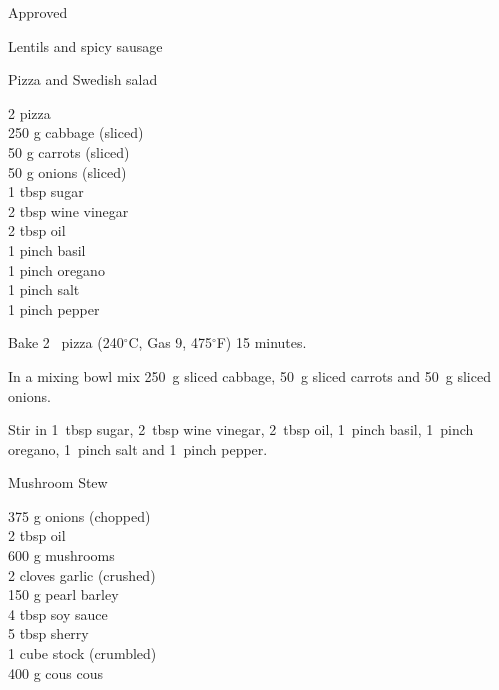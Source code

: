 \begin{menu}{Approved}
\begin{recipe}{2}{Lentils and spicy sausage}
\begin{instructions}
    \end{instructions}
    \end{recipe}%
  
    \begin{recipe}{1}{Pizza and Swedish salad}%
    
		\begin{ingredients}
		2  pizza  \\
	250 g cabbage (sliced) \\
	50 g carrots (sliced) \\
	50 g onions (sliced) \\
	1 tbsp sugar  \\
	2 tbsp wine vinegar  \\
	2 tbsp oil  \\
	1 pinch basil  \\
	1 pinch oregano  \\
	1 pinch salt  \\
	1 pinch pepper  \\
	
		\end{ingredients}
	
	
    \begin{instructions}
    \item 
        Bake 2~  pizza
      (240$^{\circ}$C, Gas 9, 475$^{\circ}$F)
     15 minutes.
      \item 
        In a mixing bowl mix
        250~g sliced cabbage,
        50~g sliced carrots
        and
        50~g sliced onions.
      \item 
        Stir in
        1~tbsp  sugar,
        2~tbsp  wine vinegar,
        2~tbsp  oil,
        1~pinch  basil,
        1~pinch  oregano,
        1~pinch  salt
        and
        1~pinch  pepper.
      
    \end{instructions}
    \end{recipe}%
  
    \begin{recipe}{2}{Mushroom Stew}%
    
		\begin{ingredients}
		375 g onions (chopped) \\
	2 tbsp oil  \\
	600 g mushrooms  \\
	2 cloves garlic (crushed) \\
	150 g pearl barley  \\
	4 tbsp soy sauce  \\
	5 tbsp sherry  \\
	1 cube stock (crumbled) \\
	400 g cous cous  \\
	

\end{ingredients}
\end{recipe}
\end{menu}
